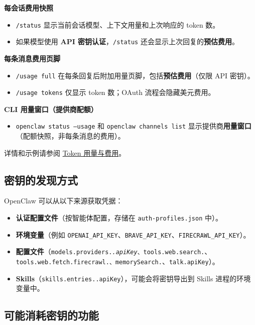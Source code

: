 \textbf{每会话费用快照}

\begin{itemize}
  \item \texttt{/status} 显示当前会话模型、上下文用量和上次响应的 token 数。
  \item 如果模型使用 \textbf{API 密钥认证}，\texttt{/status} 还会显示上次回复的\textbf{预估费用}。
\end{itemize}


\textbf{每条消息费用页脚}

\begin{itemize}
  \item \texttt{/usage full} 在每条回复后附加用量页脚，包括\textbf{预估费用}（仅限 API 密钥）。
  \item \texttt{/usage tokens} 仅显示 token 数；OAuth 流程会隐藏美元费用。
\end{itemize}


\textbf{CLI 用量窗口（提供商配额）}

\begin{itemize}
  \item \texttt{openclaw status --usage} 和 \texttt{openclaw channels list} 显示提供商\textbf{用量窗口}（配额快照，非每条消息的费用）。
\end{itemize}


详情和示例请参阅 \href{/reference/token-use}{Token 用量与费用}。

\subsection{密钥的发现方式}


OpenClaw 可以从以下来源获取凭据：

\begin{itemize}
  \item \textbf{认证配置文件}（按智能体配置，存储在 \texttt{auth-profiles.json} 中）。
  \item \textbf{环境变量}（例如 \texttt{OPENAI\_API\_KEY}、\texttt{BRAVE\_API\_KEY}、\texttt{FIRECRAWL\_API\_KEY}）。
  \item \textbf{配置文件}（\texttt{models.providers.\textit{.apiKey}、\texttt{tools.web.search.}}、\texttt{tools.web.fetch.firecrawl.\textit{}、\texttt{memorySearch.}}、\texttt{talk.apiKey}）。
  \item \textbf{Skills}（\texttt{skills.entries..apiKey}），可能会将密钥导出到 Skills 进程的环境变量中。
\end{itemize}


\subsection{可能消耗密钥的功能}


